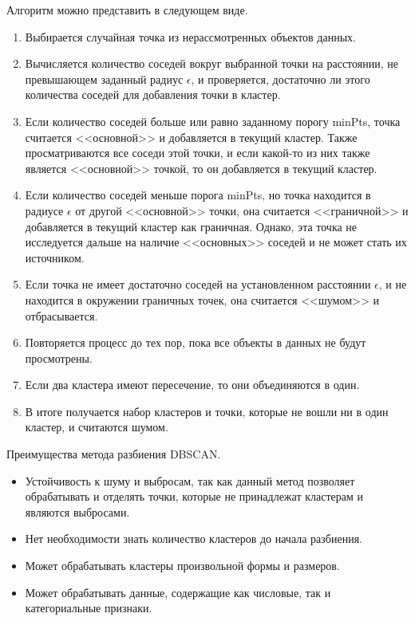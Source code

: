 Алгоритм можно представить в следующем виде.

\begin{enumerate}
    \item Выбирается случайная точка из нерассмотренных объектов данных.
    \item Вычисляется количество соседей вокруг выбранной точки на расстоянии, не превышающем заданный радиус $\epsilon$, и проверяется, достаточно ли этого количества соседей для добавления точки в кластер.
    \item Если количество соседей больше или равно заданному порогу minPts, точка считается <<основной>> и добавляется в текущий кластер. Также просматриваются все соседи этой точки, и если какой-то из них также является <<основной>> точкой, то он добавляется в текущий кластер.
    \item Если количество соседей меньше порога minPts, но точка находится в радиусе $\epsilon$ от другой <<основной>> точки, она считается <<граничной>> и добавляется в текущий кластер как граничная. Однако, эта точка не исследуется дальше на наличие <<основных>> соседей и не может стать их источником.
    \item Если точка не имеет достаточно соседей на установленном расстоянии $\epsilon$, и не находится в окружении граничных точек, она считается <<шумом>> и отбрасывается.
    \item Повторяется процесс до тех пор, пока все объекты в данных не будут просмотрены.
    \item Если два кластера имеют пересечение, то они объединяются в один.
    \item В итоге получается набор кластеров и точки, которые не вошли ни в один кластер, и считаются шумом.
\end{enumerate}

Преимущества метода разбиения DBSCAN.

\begin{itemize}
    \item Устойчивость к шуму и выбросам, так как данный метод позволяет обрабатывать и отделять точки, которые не принадлежат кластерам и являются выбросами.
    \item Нет необходимости знать количество кластеров до начала разбиения.
    \item Может обрабатывать кластеры произвольной формы и размеров.
    \item Может обрабатывать данные, содержащие как числовые, так и категориальные признаки.
\end{itemize}

